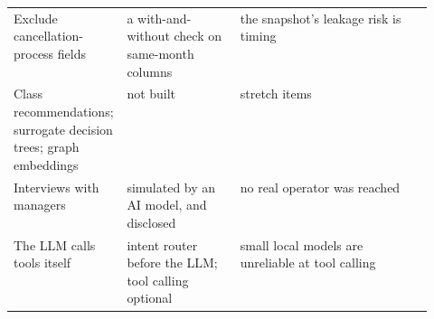 {\begin{xltabular}{\linewidth}{@{}P{0.27\linewidth} P{0.27\linewidth} L@{}}
  Exclude cancellation-process fields & a with-and-without check on same-month columns & the snapshot's leakage risk is timing \\
  Class recommendations; surrogate decision trees; graph embeddings & not built & stretch items \\
  Interviews with managers & simulated by an AI model, and disclosed & no real operator was reached \\
  The LLM calls tools itself & intent router before the LLM; tool calling optional & small local models are unreliable at tool calling \\
  \bottomrule
\end{xltabular}}
